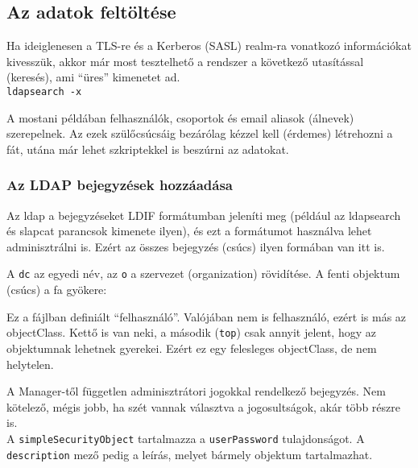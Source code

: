 \subsection{Az adatok feltöltése}
Ha ideiglenesen a TLS-re és a Kerberos (SASL) realm-ra vonatkozó információkat kivesszük, akkor már most tesztelhető a
rendszer a következő utasítással (keresés), ami ``üres'' kimenetet ad.\\
\texttt{ldapsearch -x}

A mostani példában felhasználók, csoportok és email aliasok (álnevek) szerepelnek. Az ezek szülőcsúcsáig bezárólag
kézzel kell (érdemes) létrehozni a fát, utána már lehet szkriptekkel is beszúrni az adatokat.



\subsubsection{Az LDAP bejegyzések hozzáadása}

Az ldap a bejegyzéseket LDIF formátumban jeleníti meg (például az ldapsearch és slapcat parancsok kimenete ilyen), és
ezt a formátumot használva lehet adminisztrálni is. Ezért az összes bejegyzés (csúcs) ilyen formában van itt is.

A \texttt{dc} az egyedi név, az \texttt{o} a szervezet (organization) rövidítése. A fenti objektum (csúcs) a fa
gyökere:



Ez a  fájlban definiált ``felhasználó''. Valójában nem is felhasználó, ezért is más az
objectClass. Kettő is van neki, a második (\texttt{top}) csak annyit jelent, hogy az objektumnak lehetnek
gyerekei. Ezért ez egy felesleges objectClass, de nem helytelen.


A Manager-től független adminisztrátori jogokkal rendelkező bejegyzés. Nem kötelező, mégis jobb, ha szét vannak
választva a jogosultságok, akár több részre is.\\ A \texttt{simpleSecurityObject} tartalmazza a \texttt{userPassword}
tulajdonságot. A \texttt{description} mező pedig a leírás, melyet bármely objektum tartalmazhat.

